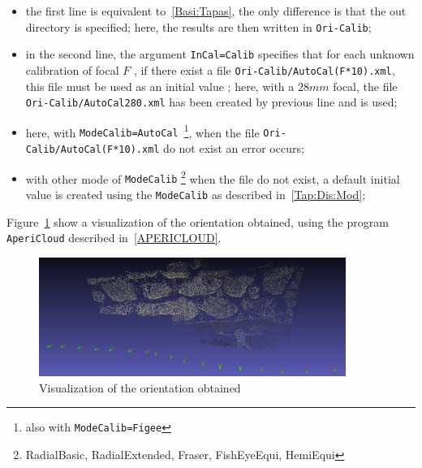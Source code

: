 \begin{itemize}
   \item the first line is equivalent to~\ref{Basi:Tapas}, the only difference
         is that the out directory is specified; here, the results are  then written
         in {\tt Ori-Calib};


   \item in the second line, the argument {\tt InCal=Calib} specifies that for each
         unknown calibration of focal $F$ , if there exist a file {\tt Ori-Calib/AutoCal(F*10).xml},
         this file must be used as an initial value ; here, with a $28mm$ focal,
         the file {\tt Ori-Calib/AutoCal280.xml} has been created by previous line
         and is used;

    \item  here, with {\tt  ModeCalib=AutoCal}~\footnote{also with {\tt ModeCalib=Figee}},
            when the file  {\tt Ori-Calib/AutoCal(F*10).xml} do not exist an error occurs;


    \item  with other mode of {\tt ModeCalib}
           \footnote{RadialBasic, RadialExtended, Fraser, FishEyeEqui, HemiEqui}
            when the file do not exist, a default initial value is created using
            the {\tt ModeCalib}  as described in~\ref{Tap:Dis:Mod};
\end{itemize}


Figure~\ref{FIG:StM:OriMur} show a visualization of the orientation obtained, using
the program {\tt AperiCloud} described in~\ref{APERICLOUD}.

\begin{figure}
\begin{center}
\includegraphics[width=100mm]{FIGS/MurSaintMartin/AperiCloudSnap00.jpg}
\end{center}
\caption{Visualization of the orientation obtained }
\label{FIG:StM:OriMur}
\end{figure}


